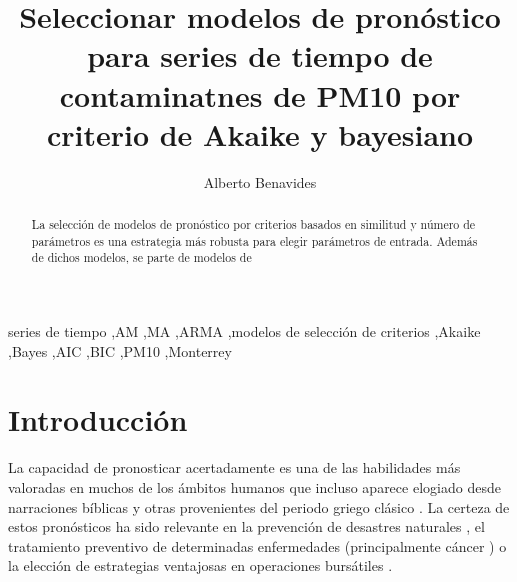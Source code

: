\documentclass{elsarticle}
\begin{document}
\begin{frontmatter}

\title{Seleccionar modelos de pronóstico para series de tiempo de contaminatnes de PM10 por criterio de Akaike y bayesiano}

\author{Alberto Benavides}
\address{Nuevo León, México}




\begin{abstract}
La selección de modelos de pronóstico por criterios basados en similitud y número de parámetros es una estrategia más robusta para elegir parámetros de entrada. Además de dichos modelos, se parte de modelos de 
\end{abstract}

\begin{keyword}
series de tiempo \sep AM \sep MA \sep ARMA \sep modelos de selección de criterios \sep Akaike \sep Bayes \sep AIC \sep BIC \sep PM10 \sep Monterrey
\end{keyword}

\end{frontmatter}


\section{Introducción}

La capacidad de pronosticar acertadamente es una de las habilidades más valoradas en muchos de los ámbitos humanos que incluso aparece elogiado desde narraciones bíblicas y otras provenientes del periodo griego clásico \cite{Hyndman2018}. La certeza de estos pronósticos ha sido relevante en la prevención de desastres naturales \cite{Cheng2007}, el tratamiento preventivo de determinadas enfermedades (principalmente cáncer \cite{Earnest2019, Kumar2014}) o la elección de estrategias ventajosas en operaciones bursátiles \cite{BabuASReddy2015, Xiao2014}. 
\end{document}
